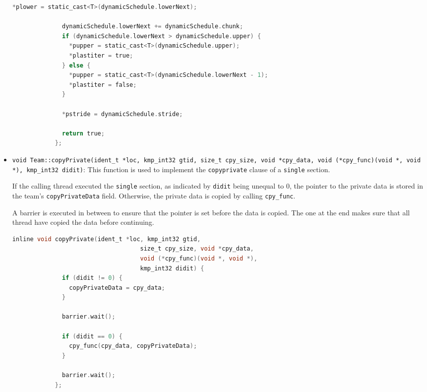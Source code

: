 \begin{itemize}
\begin{lstlisting}[language=C, caption={void Team::dispatchNext},
          label={lst:team-dispatchnext}, escapechar=@]
              *plower = static_cast<T>(dynamicSchedule.lowerNext);

              dynamicSchedule.lowerNext += dynamicSchedule.chunk;
              if (dynamicSchedule.lowerNext > dynamicSchedule.upper) {
                *pupper = static_cast<T>(dynamicSchedule.upper);
                *plastiter = true;
              } else {
                *pupper = static_cast<T>(dynamicSchedule.lowerNext - 1);
                *plastiter = false;
              }

              *pstride = dynamicSchedule.stride;

              return true;
            };
          \end{lstlisting}

	\item \texttt{void Team::copyPrivate(ident_t *loc, kmp_int32 gtid, size_t cpy_size, void
		      *cpy_data, void (*cpy_func)(void *, void *), kmp_int32 didit)}:
	      \label{subsec:team-copyprivate} This function is used to
	      implement the \texttt{copyprivate} clause of a  \texttt{single} section.

	      If the calling thread executed the \texttt{single} section, as indicated by \texttt{didit}
	      being unequal to 0, the pointer to the private data is stored in the team's \texttt{copyPrivateData}
	      field. Otherwise, the private data is copied by calling \texttt{cpy\_func}.

	      A barrier is executed in between to ensure that the pointer is set before the data is
	      copied. The one at the end makes sure that all thread have copied the data before
	      continuing.

	      \begin{lstlisting}[language=C, caption={void Team::copyprivate},
          label={lst:team-copyprivate}, escapechar=@]
            inline void copyPrivate(ident_t *loc, kmp_int32 gtid,
                                    size_t cpy_size, void *cpy_data,
                                    void (*cpy_func)(void *, void *),
                                    kmp_int32 didit) {
              if (didit != 0) {
                copyPrivateData = cpy_data;
              }

              barrier.wait();

              if (didit == 0) {
                cpy_func(cpy_data, copyPrivateData);
              }

              barrier.wait();
            };
          \end{lstlisting}


\end{itemize}
